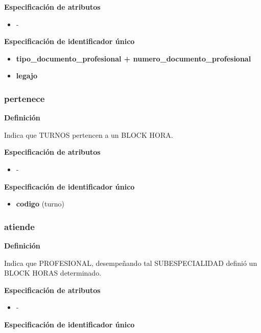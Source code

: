 \documentclass[a4paper,11pt]{article}
\begin{document}
\textbf{Especificación de atributos}

\begin{itemize}
\item -
\end{itemize}

\textbf{Especificación de identificador único}

\begin{itemize}

     \item \textbf{tipo\_documento\_profesional + numero\_documento\_profesional}

     \item \textbf{legajo} 

\end{itemize}

\subsubsection{\textbf{pertenece}}

\textbf{Definición}

Indica que TURNOS pertencen a un BLOCK HORA.

\textbf{Especificación de atributos}

\begin{itemize}
\item -
\end{itemize}

\textbf{Especificación de identificador único}

\begin{itemize}

     \item \textbf{codigo} (turno)


\end{itemize}

\subsubsection{\textbf{atiende}}

\textbf{Definición}

Indica que PROFESIONAL, desempeñando tal SUBESPECIALIDAD definió un BLOCK 
HORAS determinado.

\textbf{Especificación de atributos}

\begin{itemize}
\item -
\end{itemize}

\textbf{Especificación de identificador único}
\end{document}
